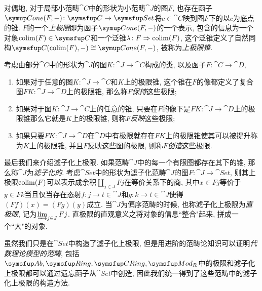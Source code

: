 对偶地, 对于局部小范畴$\cat{C}$中的形状为小范畴$\cat{J}$的图$F$, 也存在函子$\Cone(F, -)\colon \cat{C}\to\cat{Set}$将$c\in \cat{C}$映到图$F$下的以$c$为底点的锥. $F$的一个\emph{上极限}即为函子$\Cone (F, -)$的一个表示, 包含的信息为一个对象$\colim (F)\in \cat{C}$和一个泛锥$\lambda\colon F\Rightarrow \operatorname{colim} (F)$, 这个泛锥定义了自然同构$\cat{C}(\colim (F), -)\cong \Cone (F, -)$, 被称为\emph{上极限锥}.


考虑由部分$\cat{C}$中的形状为$\cat{J}$的图$K\colon \cat{J}\to\cat{C}$构成的类, 以及函子$F\colon \cat{C}\to\cat{D}$,
\begin{enumerate}
  \item 如果对于任意的图$K\colon\cat{J}\to\cat{C}$和$K$上的极限锥, 这个锥在$F$的像都定义了复合图$FK\colon \cat{J}\to\cat{D}$上的极限锥, 那么称$F$\emph{保持}这些极限;
  \item 如果对于图$K\colon\cat{J}\to\cat{C}$上的任意的锥, 只要在$F$的像下是$FK\colon \cat{J}\to\cat{D}$上的极限锥那么它就是$K$上的极限锥, 则称$F$\emph{反映}这些极限;
  \item 如果只要$FK\colon \cat{J}\to\cat{D}$在$\cat{D}$中有极限就存在$FK$上的极限锥使其可以被提升称为$K$上的极限锥, 并且$F$反映这些图的极限, 则称$F$\emph{创造}这些极限.
\end{enumerate}

最后我们来介绍滤子化上极限. 如果范畴$\cat{J}$中的每一个有限图都存在其下的锥, 那么称$\cat{J}$为\emph{滤子化的}. 考虑$\cat{Set}$中的形状为滤子化范畴$\cat{J}$的图$F\colon \cat{J}\to\cat{Set}$, 则其上极限$\operatorname{colim} (F)$可以表示成余积$\amalg_{j\in J}Fj$在等价关系下的商, 其中$x\in Fj$等价于$y\in Fk$当且仅当存在态射$f\colon j\to t\in\cat{J}$和$g\colon k\to t\in \cat{J}$使得$(Ff)(x)=(Fg)(y)$成立. 当$\cat{J}$为偏序范畴的时候, 也称滤子化上极限为\emph{直极限}, 记为$\varinjlim_{j\in J}Fj$. 直极限的直观意义之将对象的信息``整合"起来, 拼成一个``大"的对象.

虽然我们只是在$\cat{Set}$中构造了滤子化上极限, 但是用进阶的范畴论知识可以证明\emph{代数理论模型的范畴}, 包括$\cat{Ab}, \linebreak[0]\cat{Ring}, \linebreak[0]\cat{CRing}, \linebreak[0]\cat{Mod}_R$中的极限和滤子化上极限都可以通过遗忘函子从$\cat{Set}$中创造, 因此我们统一得到了这些范畴中的滤子化上极限的构造方法.

